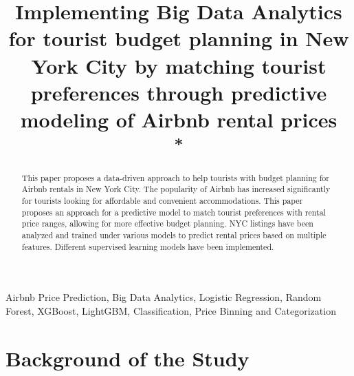 \documentclass[conference]{IEEEtran}
\begin{document}
\title{Implementing Big Data Analytics for tourist budget planning in New York City by matching tourist preferences through predictive modeling of Airbnb rental prices\\
{\footnotesize \textsuperscript{*}}
}

\author{
\and
{}
}

\maketitle
\begin{abstract}
This paper proposes a data-driven approach to help tourists with budget planning for Airbnb rentals 
in New York City. The popularity of Airbnb has increased significantly for tourists looking for affordable
 and convenient accommodations. This paper proposes an approach for a predictive model to match tourist preferences 
 with rental price ranges, allowing for more effective budget planning. NYC listings have been analyzed and trained under various models to 
 predict rental prices based on multiple features. Different supervised learning models have been  implemented. 
\end{abstract}

\begin{IEEEkeywords}
Airbnb Price Prediction, Big Data Analytics, Logistic Regression, Random Forest, XGBoost, LightGBM, Classification, Price Binning and Categorization
\end{IEEEkeywords}

\section{Background of the Study}
\end{document}
